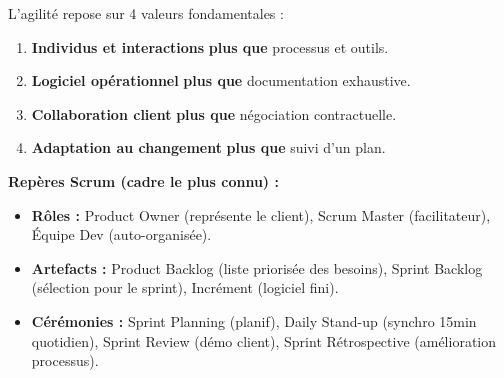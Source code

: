 \documentclass[11pt]{article}
\begin{document}
\begin{savaistu}
L'agilité repose sur 4 valeurs fondamentales :
\begin{enumerate}
    \item \textbf{Individus et interactions} \textbf{plus que} processus et outils.
    \item \textbf{Logiciel opérationnel} \textbf{plus que} documentation exhaustive.
    \item \textbf{Collaboration client} \textbf{plus que} négociation contractuelle.
    \item \textbf{Adaptation au changement} \textbf{plus que} suivi d'un plan.
\end{enumerate}
\textbf{Repères Scrum (cadre le plus connu) :}
\begin{itemize}
    \item \textbf{Rôles :} Product Owner (représente le client), Scrum Master (facilitateur), Équipe Dev (auto-organisée).
    \item \textbf{Artefacts :} Product Backlog (liste priorisée des besoins), Sprint Backlog (sélection pour le sprint), Incrément (logiciel fini).
    \item \textbf{Cérémonies :} Sprint Planning (planif), Daily Stand-up (synchro 15min quotidien), Sprint Review (démo client), Sprint Rétrospective (amélioration processus).
\end{itemize}
\end{savaistu}
\end{document}
